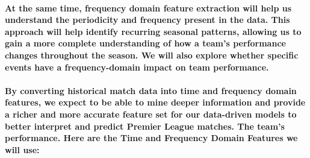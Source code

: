 \paragraph{At the same time, frequency domain feature extraction will help us understand the periodicity and frequency present in the data. This approach will help identify recurring seasonal patterns, allowing us to gain a more complete understanding of how a team's performance changes throughout the season. We will also explore whether specific events have a frequency-domain impact on team performance.}
% 
\paragraph{By converting historical match data into time and frequency domain features, we expect to be able to mine deeper information and provide a richer and more accurate feature set for our data-driven models to better interpret and predict Premier League matches. The team's performance. Here are the Time and Frequency Domain Features we will use:}
% 
% 
% 
% 
% 
% 
% 
% 
% 
